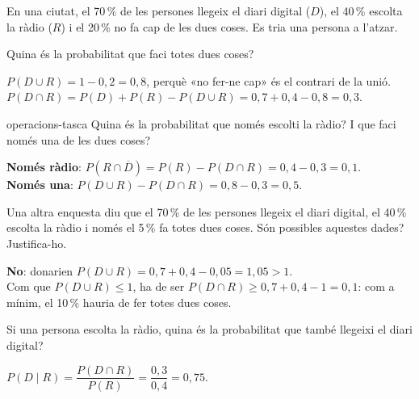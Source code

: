 En una ciutat, el 70\,\% de les persones llegeix el diari digital ($D$), el 40\,\% escolta la ràdio ($R$) i
el 20\,\% no fa cap de les dues coses. Es tria una persona a l'atzar.

\begin{apartats}

Quina és la probabilitat que faci totes dues coses?

\begin{solucio}
$P(D\cup R)=1-0{,}2=0{,}8$, perquè «no fer-ne cap» és el contrari de la unió.\\
$P(D\cap R)=P(D)+P(R)-P(D\cup R)=0{,}7+0{,}4-0{,}8=0{,}3$.
\end{solucio}

\begin{tria}{operacions-tasca}
Quina és la probabilitat que només escolti la ràdio? I que faci només una de les dues coses?

\begin{solucio}
\textbf{Només ràdio}: $P\left(R\cap\overline{D}\right)=P(R)-P(D\cap R)=0{,}4-0{,}3=0{,}1$.\\
\textbf{Només una}: $P(D\cup R)-P(D\cap R)=0{,}8-0{,}3=0{,}5$.
\end{solucio}

Una altra enquesta diu que el 70\,\% de les persones llegeix el diari digital, el 40\,\% escolta la ràdio
i només el 5\,\% fa totes dues coses. Són possibles aquestes dades? Justifica-ho.

\begin{solucio}
\textbf{No}: donarien $P(D\cup R)=0{,}7+0{,}4-0{,}05=1{,}05>1$.\\
Com que $P(D\cup R)\le1$, ha de ser $P(D\cap R)\ge0{,}7+0{,}4-1=0{,}1$: com a mínim, el 10\,\% hauria de
fer totes dues coses.
\end{solucio}
\end{tria}

\begin{nomesllarg}
Si una persona escolta la ràdio, quina és la probabilitat que també llegeixi el diari digital?

\begin{solucio}
$P(D\mid R)=\dfrac{P(D\cap R)}{P(R)}=\dfrac{0{,}3}{0{,}4}=0{,}75$.
\end{solucio}
\end{nomesllarg}

\end{apartats}
